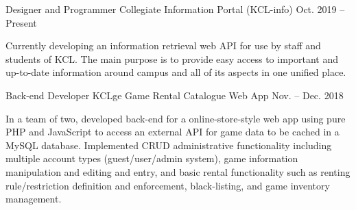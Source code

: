 

\begin{cventries}

    \cventry
    {Designer and Programmer} %
    {Collegiate Information Portal (KCL-info)} %
    {} %
    {Oct. 2019 -- Present} %
    {
        \begin{cvitems}
            Currently developing an information retrieval web API for use by staff and students of KCL. The main purpose is to provide easy access to important and up-to-date information around campus and all of its aspects in one unified place.
        \end{cvitems}
    }

    \cventry
    {Back-end Developer} %
    {KCLge Game Rental Catalogue Web App} %
    {} %
    {Nov. -- Dec. 2018} %
    {
        \begin{cvitems}
            In a team of two, developed back-end for a online-store-style web app using pure PHP and JavaScript to access an external API for game data to be cached in a MySQL database. Implemented CRUD administrative functionality including multiple account types (guest/user/admin system), game information manipulation and editing and entry, and basic rental functionality such as renting rule/restriction definition and enforcement, black-listing, and game inventory management.
        \end{cvitems}
    }
\end{cventries}

